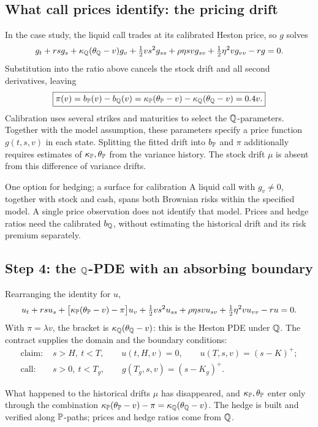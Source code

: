 \documentclass[10pt]{article}
\theoremstyle{definition}\newtheorem{definition}{Definition}[section]
\begin{document}
\subsection{What call prices identify: the pricing drift}
In the case study, the liquid call trades at its calibrated Heston price,
so \(g\) solves
\[
g_t+rsg_s+\kappa_\mathbb Q(\theta_\mathbb Q-v)g_v+
\tfrac12vs^2g_{ss}+\rho\eta svg_{sv}+\tfrac12\eta^2vg_{vv}-rg=0.
\]
Substitution into the ratio above cancels the stock drift and all
second derivatives, leaving
\[
\boxed{\pi(v)=b_\mathbb P(v)-b_\mathbb Q(v)
=\kappa_\mathbb P(\theta_\mathbb P-v)-\kappa_\mathbb Q(\theta_\mathbb Q-v)=0.4v.}
\]
Calibration uses several strikes and maturities to select the \(\mathbb Q\)-parameters.
Together with the model assumption, these parameters specify a price
function \(g(t,s,v)\) in each state. Splitting the fitted drift into
\(b_\mathbb P\) and \(\pi\) additionally requires estimates of
\(\kappa_\mathbb P,\theta_\mathbb P\) from the variance history. The stock drift \(\mu\)
is absent from this difference of variance drifts.

\begin{keyidea}{One option for hedging; a surface for calibration}
A liquid call with \(g_v\ne0\), together with stock and cash, spans both
Brownian risks within the specified model. A single price observation
does not identify that model. Prices and hedge ratios need the calibrated
\(b_\mathbb Q\), without estimating the historical drift and its risk premium
separately.
\end{keyidea}

\subsection{Step 4: the \texorpdfstring{\(\mathbb Q\)}{Q}-PDE with an absorbing boundary}
Rearranging the identity for \(u\),
\[
u_t+rsu_s+\bigl[\kappa_\mathbb P(\theta_\mathbb P-v)-\pi\bigr]u_v
+\tfrac12vs^2u_{ss}+\rho\eta svu_{sv}+\tfrac12\eta^2vu_{vv}-ru=0.
\]
With \(\pi=\lambda v\), the bracket is \(\kappa_\mathbb Q(\theta_\mathbb Q-v)\): this is the
Heston PDE under \(\mathbb Q\). The contract supplies the domain and the boundary
conditions:
\[
\begin{aligned}
\text{claim: }&s>H,\ t<T,\qquad u(t,H,v)=0,\qquad u(T,s,v)=(s-K)^+;\\
\text{call: }&s>0,\ t<T_g,\qquad g(T_g,s,v)=(s-K_g)^+.
\end{aligned}
\]
\begin{keyidea}{What happened to the historical drifts}
\(\mu\) has disappeared, and \(\kappa_\mathbb P,\theta_\mathbb P\) enter only through the
combination \(\kappa_\mathbb P(\theta_\mathbb P-v)-\pi=\kappa_\mathbb Q(\theta_\mathbb Q-v)\). The hedge is
built and verified along \(\mathbb P\)-paths; prices and hedge ratios come from \(\mathbb Q\).
\end{keyidea}
\end{document}
